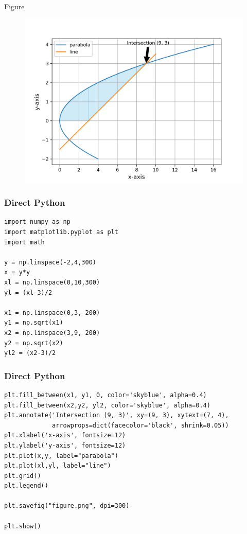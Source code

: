 \documentclass{beamer}
\begin{document}
\begin{frame}{Figure}
    \begin{figure}[H]
        \centering
        \includegraphics[width=0.9\columnwidth]{figs/figure.png}
        \caption{}
        \label{fig:placeholder}
    \end{figure}
\end{frame}
\begin{frame}[fragile]
\frametitle{Direct Python}
\begin{lstlisting}
import numpy as np
import matplotlib.pyplot as plt
import math

y = np.linspace(-2,4,300)
x = y*y
xl = np.linspace(0,10,300)
yl = (xl-3)/2

x1 = np.linspace(0,3, 200)
y1 = np.sqrt(x1)
x2 = np.linspace(3,9, 200)
y2 = np.sqrt(x2)
yl2 = (x2-3)/2

\end{lstlisting}
\end{frame}
\begin{frame}[fragile]
\frametitle{Direct Python}
\begin{lstlisting}
plt.fill_between(x1, y1, 0, color='skyblue', alpha=0.4) 
plt.fill_between(x2,y2, yl2, color='skyblue', alpha=0.4)
plt.annotate('Intersection (9, 3)', xy=(9, 3), xytext=(7, 4),
             arrowprops=dict(facecolor='black', shrink=0.05))
plt.xlabel('x-axis', fontsize=12)
plt.ylabel('y-axis', fontsize=12)
plt.plot(x,y, label="parabola")
plt.plot(xl,yl, label="line")
plt.grid()
plt.legend()

plt.savefig("figure.png", dpi=300)

plt.show()
\end{lstlisting}
\end{frame}
\end{document}
